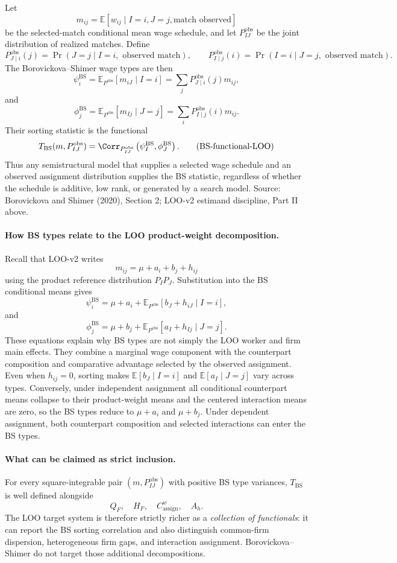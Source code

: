 \documentclass[11pt]{article}
\newcommand{\E}{\mathbb{E}}
\begin{document}
Let
\[
m_{ij}=\E[w_{ij}\mid I=i,J=j,\text{match observed}]
\]
be the selected-match conditional mean wage schedule, and let
\(P_{IJ}^{\mathrm{obs}}\) be the joint distribution of realized matches.  Define
\[
P_{J\mid i}^{\mathrm{obs}}(j)
=\Pr(J=j\mid I=i,\text{ observed match}),
\qquad
P_{I\mid j}^{\mathrm{obs}}(i)
=\Pr(I=i\mid J=j,\text{ observed match}).
\]
The Borovickova--Shimer wage types are then
\[
\psi_i^{\mathrm{BS}}
=
\E_{P^{\mathrm{obs}}}[m_{iJ}\mid I=i]
=
\sum_jP_{J\mid i}^{\mathrm{obs}}(j)m_{ij},
\tag{BS-worker-type-LOO}
\]
and
\[
\phi_j^{\mathrm{BS}}
=
\E_{P^{\mathrm{obs}}}[m_{Ij}\mid J=j]
=
\sum_iP_{I\mid j}^{\mathrm{obs}}(i)m_{ij}.
\tag{BS-firm-type-LOO}
\]
Their sorting statistic is the functional
\[
T_{\mathrm{BS}}(m,P_{IJ}^{\mathrm{obs}})
=
\Corr_{P_{IJ}^{\mathrm{obs}}}
\left(\psi_I^{\mathrm{BS}},\phi_J^{\mathrm{BS}}\right).
\tag{BS-functional-LOO}
\]
Thus any semistructural model that supplies a selected wage schedule and an
observed assignment distribution supplies the BS statistic, regardless of
whether the schedule is additive, low rank, or generated by a search model.
Source: Borovickova and Shimer (2020), Section 2; LOO-v2 estimand discipline,
Part II above.

\paragraph{How BS types relate to the LOO product-weight decomposition.}
Recall that LOO-v2 writes
\[
m_{ij}=\mu+a_i+b_j+h_{ij}
\]
using the product reference distribution \(P_IP_J\).  Substitution into the BS
conditional means gives
\[
\psi_i^{\mathrm{BS}}
=
\mu+a_i
+\E_{P^{\mathrm{obs}}}[b_J+h_{iJ}\mid I=i],
\tag{BS-worker-decomposition}
\]
and
\[
\phi_j^{\mathrm{BS}}
=
\mu+b_j
+\E_{P^{\mathrm{obs}}}[a_I+h_{Ij}\mid J=j].
\tag{BS-firm-decomposition}
\]
These equations explain why BS types are not simply the LOO worker and firm
main effects.  They combine a marginal wage component with the counterpart
composition and comparative advantage selected by the observed assignment.
Even when \(h_{ij}=0\), sorting makes
\(\E[b_J\mid I=i]\) and \(\E[a_I\mid J=j]\) vary across types.  Conversely,
under independent assignment all conditional counterpart means collapse to
their product-weight means and the centered interaction means are zero, so the
BS types reduce to \(\mu+a_i\) and \(\mu+b_j\).  Under dependent assignment,
both counterpart composition and selected interactions can enter the BS types.

\paragraph{What can be claimed as strict inclusion.}
For every square-integrable pair \((m,P_{IJ}^{\mathrm{obs}})\) with positive BS
type variances, \(T_{\mathrm{BS}}\) is well defined alongside
\[
Q_F,\quad H_F,\quad C_{\mathrm{assign}}^w,\quad A_h.
\]
The LOO target system is therefore strictly richer as a \emph{collection of
functionals}: it can report the BS sorting correlation and also distinguish
common-firm dispersion, heterogeneous firm gaps, and interaction assignment.
Borovickova--Shimer do not target those additional decompositions.
\end{document}
